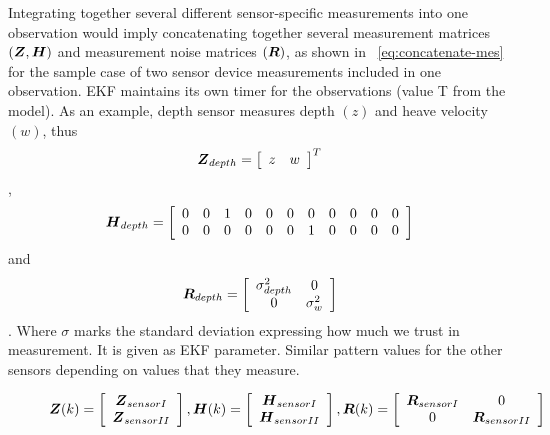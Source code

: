 Integrating together several different sensor-specific measurements into one observation would imply concatenating together several measurement matrices $(\boldsymbol{Z}, \boldsymbol{H})$ and measurement noise matrices $(\boldsymbol{R})$, as shown in ~\ref{eq:concatenate-mes} for the sample case of two sensor device measurements included in one observation. EKF maintains its own timer for the observations (value T from the model). As an example, depth sensor measures depth $(z)$ and heave velocity $(w)$, thus $$\boldsymbol{Z}_{depth} =\left[\begin{array}{cc} z & w \end{array} \right] ^{T}$$, $$\boldsymbol{H}_{depth} =\left[\begin{array}{ccccccccccc} 0 & 0 & 1 & 0 & 0 & 0 & 0 & 0 & 0 & 0 & 0 \\ 0 & 0 & 0 & 0 & 0 & 0 & 1 & 0 & 0 & 0 & 0 \end{array} \right]$$ and $$\boldsymbol{R}_{depth} =\left[\begin{array}{cc} \sigma_{depth}^{2} & 0 \\ 0 & \sigma_{w}^{2} \end{array} \right] $$. Where $\sigma$ marks the standard deviation expressing how much we trust in  measurement. It is given as EKF parameter. Similar pattern values for the other sensors depending on values that they measure.
\begin{figure}
\begin{equation}
\label{eq:concatenate-mes} 
\boldsymbol{Z}(k) = \left[ \begin{array}{c} \boldsymbol{Z}_{sensor I} \\ \boldsymbol{Z}_{sensor II}  \end{array} \right],
\boldsymbol{H}(k) = \left[ \begin{array}{c} \boldsymbol{H}_{sensor I} \\ \boldsymbol{H}_{sensor II}  \end{array} \right], 
\boldsymbol{R}(k) = \left[ \begin{array}{ccc} \boldsymbol{R}_{sensor I} & 0 \\ 0 & \boldsymbol{R}_{sensor II} \end{array} \right]
\end{equation}
\vspace{-10pt}
\end{figure}

